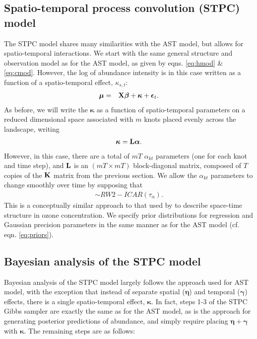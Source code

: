 \documentclass[12pt,fleqn]{article}
\begin{document}
\begin{flushleft}
\section{Spatio-temporal process convolution (STPC) model}

The STPC model shares many similarities with the AST model, but allows for spatio-temporal interactions.  We start
with the same general structure and observation model as for the AST model, as given by eqns. \ref{eq:hmod} \& \ref{eq:cmod}.  However, the log of abundance intensity is in this case written as a function of a spatio-temporal
effect, $\kappa_{s,t}$:
\begin{eqnarray*}
  \boldsymbol{\mu} & = & {\bf X} \boldsymbol{\beta} + \boldsymbol{\kappa} + \boldsymbol{\epsilon}_t.
\end{eqnarray*}
As before, we will write the $\boldsymbol{\kappa}$ as a function of spatio-temporal parameters on a reduced dimensional space associated with $m$ knots placed evenly across the landscape, writing
\begin{eqnarray*}
  \boldsymbol{\kappa} = {\bf L} \boldsymbol{\alpha}.
\end{eqnarray*}
However, in this case, there are a total of $mT$ $\alpha_{kt}$ parameters (one for each knot and time step), and ${\bf L}$ is an $(mT \times mT)$ block-diagonal matrix, composed of $T$ copies of the ${\bf K}$ matrix from the previous section.  We allow the
$\alpha_{kt}$ parameters to change smoothly over time by supposing that
\begin{eqnarray*}
  [\alpha_{k1} \alpha_{k2} \hdots \alpha_{kt}] \sim RW2-ICAR(\tau_\alpha).
\end{eqnarray*}
This is a conceptually similar approach to that used by \citet{CalderEtAl2002} to describe space-time structure in ozone concentration.  We specify prior distributions for regression and Gaussian precision parameters in the same manner as for the AST model (cf. eqn. \ref{eq:priors}).

\subsection{Bayesian analysis of the STPC model}

Bayesian analysis of the STPC model largely follows the approach used for AST model, with the exception that instead of separate spatial ($\boldsymbol{\eta}$) and temporal ($\boldsymbol{\gamma}$) effects, there is a single spatio-temporal effect, $\boldsymbol{\kappa}$.  In fact, steps 1-3 of the STPC Gibbs sampler are exactly the same as for the AST model, as is the approach for generating posterior predictions of abundance, and simply require placing $\boldsymbol{\eta}+\boldsymbol{\gamma}$ with $\boldsymbol{\kappa}$.  The remaining steps are as follows:


\end{flushleft}
\end{document}
